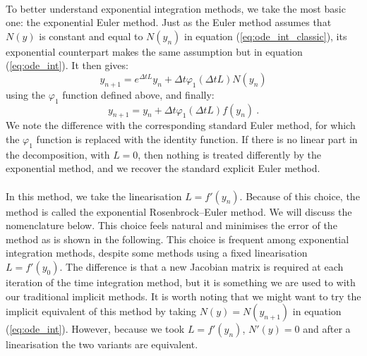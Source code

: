       \paragraph{}
      To better understand exponential integration methods, we take the most basic one: the exponential Euler method.
      Just as the Euler method assumes that $N\left(y\right)$ is constant and equal to $N\left(y_n\right)$ in equation (\ref{eq:ode_int_classic}), its exponential counterpart makes the same assumption but in equation (\ref{eq:ode_int}).
      It then gives:
      \begin{equation}
        y_{n+1} = e^{\Delta t L} y_n + \Delta t \varphi_1\left(\Delta t L\right) N\left(y_n\right)
      \end{equation}
      using the $\varphi_1$ function defined above, and finally:
      \begin{equation}\label{eq:expeuler}
        y_{n+1} = y_n + \Delta t \varphi_1\left(\Delta t L\right) f\left(y_n\right) \ .
      \end{equation}
      We note the difference with the corresponding standard Euler method, for which the $\varphi_1$ function is replaced with the identity function.
      If there is no linear part in the decomposition, with $L = 0$, then nothing is treated differently by the exponential method, and we recover the standard explicit Euler method.

      \paragraph{}
      In this method, we take the linearisation $L = f'\left(y_n\right)$.
      Because of this choice, the method is called the exponential Rosenbrock--Euler method.
      We will discuss the nomenclature below.
      This choice feels natural and minimises the error of the method as is shown in the following.
      This choice is frequent among exponential integration methods, despite some methods using a fixed linearisation $L = f'\left(y_0\right)$.
      The difference is that a new Jacobian matrix is required at each iteration of the time integration method, but it is something we are used to with our traditional implicit methods.
      It is worth noting that we might want to try the implicit equivalent of this method by taking $N\left(y\right) = N\left(y_{n+1}\right)$ in equation (\ref{eq:ode_int}).
      However, because we took $L = f'\left(y_n\right)$, $N'\left(y\right) = 0$ and after a linearisation the two variants are equivalent.


